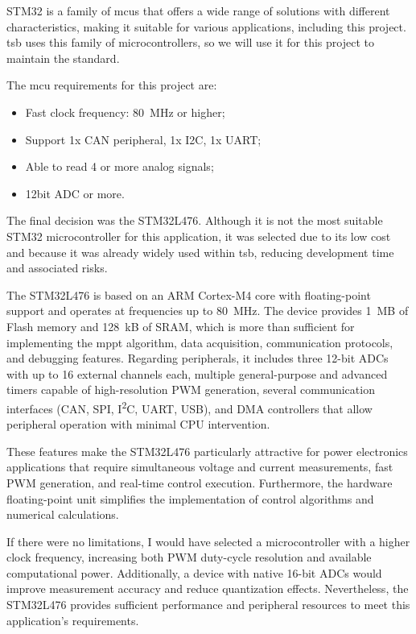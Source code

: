         STM32 is a family of \acp{mcu} that offers a wide range of solutions with different characteristics, making it suitable for various applications, including this project. \ac{tsb} uses this family of microcontrollers, so we will use it for this project to maintain the standard. 

        The \ac{mcu} requirements for this project are:
        \begin{itemize}[leftmargin=4em, itemsep=1pt, topsep=2pt]
            \item Fast clock frequency: 80~MHz or higher;
            \item Support 1x CAN peripheral, 1x I2C, 1x UART;
            \item Able to read 4 or more analog signals;
            \item 12bit ADC or more.
        \end{itemize}

        The final decision was the STM32L476. Although it is not the most suitable STM32 microcontroller for this application, it was selected due to its low cost and because it was already widely used within \ac{tsb}, reducing development time and associated risks.

        The STM32L476 is based on an ARM Cortex-M4 core with floating-point support and operates at frequencies up to 80~MHz. The device provides 1~MB of Flash memory and 128~kB of SRAM, which is more than sufficient for implementing the \ac{mppt} algorithm, data acquisition, communication protocols, and debugging features. Regarding peripherals, it includes three 12-bit ADCs with up to 16 external channels each, multiple general-purpose and advanced timers capable of high-resolution PWM generation, several communication interfaces (CAN, SPI, I\textsuperscript{2}C, UART, USB), and DMA controllers that allow peripheral operation with minimal CPU intervention.

        These features make the STM32L476 particularly attractive for power electronics applications that require simultaneous voltage and current measurements, fast PWM generation, and real-time control execution. Furthermore, the hardware floating-point unit simplifies the implementation of control algorithms and numerical calculations.

        If there were no limitations, I would have selected a microcontroller with a higher clock frequency, increasing both PWM duty-cycle resolution and available computational power. Additionally, a device with native 16-bit ADCs would improve measurement accuracy and reduce quantization effects. Nevertheless, the STM32L476 provides sufficient performance and peripheral resources to meet this application's requirements.

